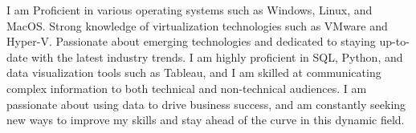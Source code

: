 \documentclass[11 pt,oneside,a4paper,titlepage]{article}
\begin{document}
{\begin{minipage}{7.4cm}
       I am Proficient in various operating systems such as Windows, Linux, and MacOS. Strong knowledge of virtualization technologies such as VMware and Hyper-V. Passionate about emerging technologies and dedicated to staying up-to-date with the latest industry trends. I am highly proficient in SQL, Python, and data visualization tools such as Tableau, and I am skilled at communicating complex information to both technical and non-technical audiences. I am passionate about using data to drive business success, and am constantly seeking new ways to improve my skills and stay ahead of the curve in this dynamic field.
        

\end{minipage}}
\end{document}
